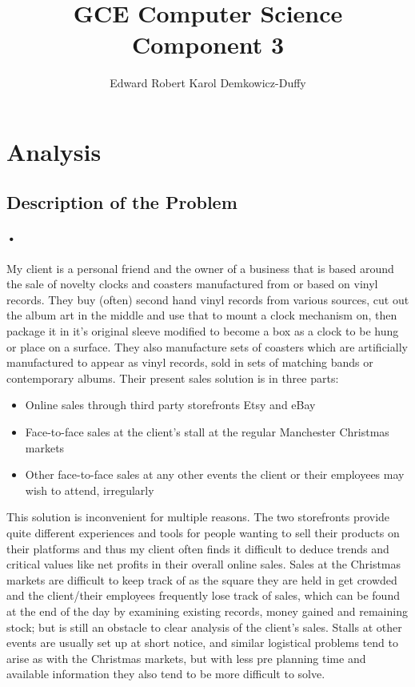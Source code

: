 \documentclass{article}
\title{GCE Computer Science Component 3}
\author{Edward Robert Karol Demkowicz-Duffy}
\begin{document}
    \maketitle
    \newpage
    \tableofcontents
    \newpage
    
    \section{Analysis}
    
    \subsection{Description of the Problem}
    \paragraph{•}
    My client is a personal friend and the owner of a business that is based around the sale of novelty clocks and coasters manufactured from or based on vinyl records. 
    They buy (often) second hand vinyl records from various sources, cut out the album art in the middle and use that to mount a clock mechanism on, then package it in it’s original sleeve modified to become a box as a clock to be hung or place on a surface. 
    They also manufacture sets of coasters which are artificially manufactured to appear as vinyl records, sold in sets of matching bands or contemporary albums. 
    Their present sales solution is in three parts:
    \begin{itemize}
    \item Online sales through third party storefronts Etsy and eBay
    \item Face-to-face sales at the client’s stall at the regular Manchester Christmas markets
    \item Other face-to-face sales at any other events the client or their employees may wish to attend, irregularly
    \end{itemize}
    This solution is inconvenient for multiple reasons. 
    The two storefronts provide quite different experiences and tools for people wanting to sell their products on their platforms and thus my client often finds it difficult to deduce trends and critical values like net profits in their overall online sales. 
    Sales at the Christmas markets are difficult to keep track of as the square they are held in get crowded and the client/their employees frequently lose track of sales, which can be found at the end of the day by examining existing records, money gained and remaining stock; but is still an obstacle to clear analysis of the client’s sales. 
    Stalls at other events are usually set up at short notice, and similar logistical problems tend to arise as with the Christmas markets, but with less pre planning time and available information they also tend to be more difficult to solve. 
\end{document}
